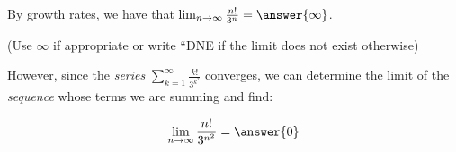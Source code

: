 \documentclass{ximera}
\begin{document}
\begin{exercise}
\begin{exercise}
By growth rates, we have that $\lim_{n \to \infty} \frac{n!}{3^n} = \answer{\infty}$.

(Use $\infty$ if appropriate or write ``DNE if the limit does not exist otherwise)

However, since the \emph{series} $\sum_{k=1}^{\infty} \frac{k!}{3^{k^2}}$ converges, we can determine the limit of the \emph{sequence} whose terms we are summing and find:

\[
\lim_{n \to \infty} \frac{n!}{3^{n^2}} = \answer{0}
\]

\end{exercise}

\end{exercise}
\end{document}

